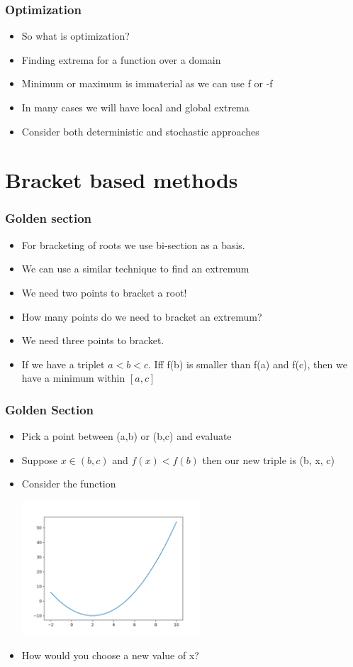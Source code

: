 \documentclass[10pt]{beamer}
\begin{document}
\begin{frame}
  \frametitle{Optimization}
  \begin{itemize}
  \item So what is optimization? \pause
  \item Finding extrema for a function over a domain
  \item Minimum or maximum is immaterial as we can use f or -f
  \item In many cases we will have local and global extrema
  \item Consider both deterministic and stochastic approaches
  \end{itemize}
\end{frame}

\section{Bracket based methods}
\label{sec:golden-section}

\begin{frame}
  \frametitle{Golden section}
  \begin{itemize}
  \item For bracketing of roots we use bi-section as a basis. 
  \item We can use a similar technique to find an extremum
  \item We need two points to bracket a root!
  \item How many points do we need to bracket an extremum? \pause
  \item We need three points to bracket. 
  \item If we have a triplet $ a < b < c$. Iff f(b) is smaller than
    f(a) and f(c), then we have a minimum within $[a,c]$
  \end{itemize}
\end{frame}

\begin{frame}
  \frametitle{Golden Section}
  \begin{itemize}
  \item Pick a point between (a,b) or (b,c) and evaluate 
  \item Suppose $x\in (b,c)$ and $f(x) < f(b)$ then our new triple is
    (b, x, c)
  \item Consider the function
    \centerline{\includegraphics[height=5cm]{minimum}}
  \item How would you choose a new value of x? 
  \end{itemize}
\end{frame}
\end{document}
